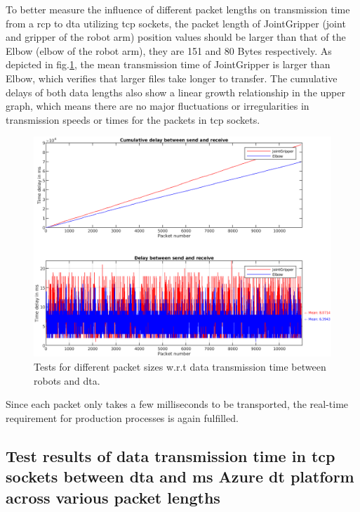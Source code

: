 To better measure the influence of different packet lengths on transmission time from 
a \gls{rcp} to \gls{dta} utilizing \gls{tcp} sockets, the packet length of JointGripper 
(joint and gripper of the robot arm) position values should be larger than that of the 
Elbow (elbow of the robot arm), they are 151 and 80 Bytes respectively. As depicted in 
fig.\ref{fig: SR-JointGripper-Elbow}, the mean transmission time of JointGripper is 
larger than Elbow, which verifies that larger files take longer to transfer. 
The cumulative delays of both data lengths also show a linear growth relationship in 
the upper graph, which means there are no major fluctuations or irregularities in 
transmission speeds or times for the packets in \gls{tcp} sockets. 


\begin{figure}[htb]
    \centering
    \includegraphics[width=\textwidth]{figures/tests/DT/Delay_SendReceive_JointGripper_Elbow.png}
    \caption{Tests for different packet sizes w.r.t data transmission time between robots 
    and \gls{dta}. \label{fig: SR-JointGripper-Elbow}}
\end{figure}

Since each packet only takes a few milliseconds to be transported, the real-time 
requirement for production processes is again fulfilled. 



\subsection{Test results of data transmission time in \gls{tcp} sockets between \gls{dta} 
and \gls{ms} Azure \gls{dt} platform across various packet lengths} \label{chap: Result-DTA-DT}

